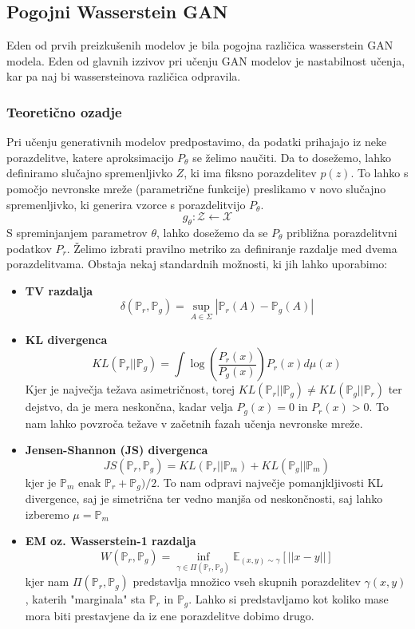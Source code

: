 \documentclass[12pt,a4paper,twoside]{article}
\theoremstyle{definition} %
\theoremstyle{plain} %
\numberwithin{equation}{section}  %
\begin{document}
\subsection{Pogojni Wasserstein GAN}
Eden od prvih preizkušenih modelov je bila pogojna različica wasserstein GAN \cite{arjovsky2017wasserstein} modela. Eden od glavnih izzivov pri učenju GAN modelov je nastabilnost učenja, kar pa naj bi wassersteinova različica odpravila. 
\subsubsection{Teoretično ozadje}
Pri učenju generativnih modelov predpostavimo, da podatki prihajajo iz neke porazdelitve,  katere aproksimacijo $P_\theta$ se želimo naučiti.  Da to dosežemo, lahko definiramo slučajno spremenljivko $Z$, ki ima fiksno porazdelitev $p(z)$. To  lahko s pomočjo nevronske mreže (parametrične funkcije) preslikamo v novo slučajno spremenljivko, ki generira vzorce s porazdelitvijo $P_\theta$.
$$ g_\theta : \mathcal{Z} \leftarrow \mathcal{X}$$ 
S spreminjanjem parametrov $\theta$, lahko dosežemo da se $P_\theta$ približna porazdelitvni podatkov $P_r$. 
Želimo izbrati pravilno metriko za definiranje  razdalje med dvema porazdelitvama. 
Obstaja nekaj standardnih možnosti, ki jih lahko uporabimo: 

\begin{itemize}
\item \textbf{TV razdalja}
$$ \delta(\mathbb{P}_r,\mathbb{P}_g) = \sup_{A \in \Sigma} | \mathbb{P}_r(A) - \mathbb{P}_g(A)| $$
\item \textbf{KL divergenca}
$$ KL(\mathbb{P}_r || \mathbb{P}_g) = \int \log{(\frac{P_r(x)}{P_g(x)})}P_r(x)d\mu(x)$$
Kjer je največja težava asimetričnost, torej $KL(\mathbb{P}_r || \mathbb{P}_g) \neq KL(\mathbb{P}_g || \mathbb{P}_r )$ ter 
dejstvo, da je mera neskončna, kadar velja $P_g(x) = 0$ in $P_r(x) > 0$. To nam lahko povzroča težave v začetnih fazah učenja nevronske mreže. 
\item \textbf{Jensen-Shannon (JS) divergenca}
$$ JS(\mathbb{P}_r,\mathbb{P}_g) = KL(\mathbb{P}_r || \mathbb{P}_m) + KL(\mathbb{P}_g || \mathbb{P}_m)$$
kjer je $\mathbb{P}_m$ enak $\mathbb{P}_r + \mathbb{P}_g)/2$. To nam  odpravi  največje pomanjkljivosti KL divergence, saj je simetrična ter  vedno manjša od neskončnosti, saj lahko izberemo $\mu = \mathbb{P}_m$
\item \textbf{EM oz. Wasserstein-1 razdalja}
$$ W(\mathbb{P}_r,\mathbb{P}_g) = \inf_{\gamma \in \Pi(\mathbb{P}_r,\mathbb{P}_g) }\mathbb{E}_{(x,y) \sim \gamma} [||x-y||]$$
kjer nam $\Pi(\mathbb{P}_r,\mathbb{P}_g)$ predstavlja množico vseh skupnih porazdelitev $\gamma(x,y)$, katerih "marginala" sta $\mathbb{P}_r$ in $\mathbb{P}_g$.  Lahko si predstavljamo kot koliko mase mora biti prestavjene da iz ene porazdelitve dobimo drugo. 
\end{itemize}
\end{document}
